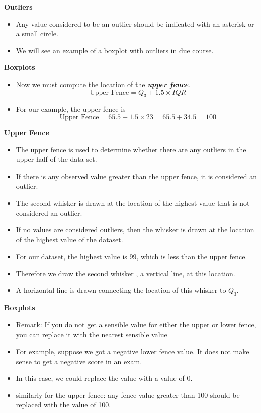 \documentclass[]{report}
\begin{document}
{
\noindent \textbf{Outliers}
\begin{itemize}
\item  Any value considered to be an outlier should be indicated with an asterisk or a small circle.
\item  We will see an example of a boxplot with outliers in due course.
\end{itemize}


}
{
\textbf{Boxplots}
\begin{itemize}
\item  Now we must compute the location of the \textbf{\emph{upper fence}}.
\[ \mbox{ Upper Fence}  = Q_3 + 1.5 \times IQR \]
\item  For our example, the upper fence is
\[ \mbox{ Upper Fence}  = 65.5  + 1.5 \times 23  = 65.5 + 34.5 = 100 \]

\end{itemize}

\noindent \textbf{Upper Fence}
\begin{itemize}
\item  The upper fence is used to determine whether there are any outliers in the upper half of the data set.
\item  If there is any observed value greater than the upper fence, it is considered an outlier.
\item  The second whisker is drawn at the location of the highest value that is not considered an outlier.
\item  If no values are considered outliers, then the whisker is drawn at the location of the highest value of the dataset.
\item  For our dataset, the highest value is 99, which is less than the upper fence.
\item  Therefore we draw the second whisker , a vertical line, at this location.
\item  A horizontal line is drawn connecting the location of this whisker to $Q_3$.
\end{itemize}
}
{
\textbf{Boxplots}
\begin{itemize}
\item  Remark: If you do not get a sensible value for either the upper or lower fence, you can replace it with the nearest sensible value
\item  For example, suppose we got a negative lower fence value. It does not make sense to get a negative score in an exam.
\item  In this case, we could replace the value with a value of $0$.
\item  similarly for the upper fence: any fence value greater than 100 should be replaced with the value of 100.
\end{itemize}
}
\end{document}
